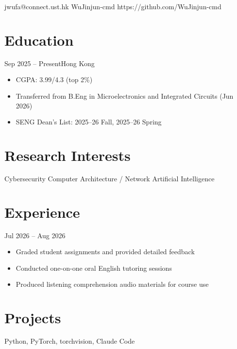 \documentclass{common/resume}
\begin{document}
  {jwufa@connect.ust.hk}
  {WuJinjun-cmd}
  {https://github.com/WuJinjun-cmd}

\section{Education}

  {Sep 2025 -- Present}{Hong Kong}

\begin{itemize}
  \item CGPA: 3.99/4.3 (top 2\%)
  \item Transferred from B.Eng in Microelectronics and Integrated Circuits (Jun 2026)
  \item SENG Dean's List: 2025--26 Fall, 2025--26 Spring
\end{itemize}

\section{Research Interests}

Cybersecurity \textbullet{} Computer Architecture / Network \textbullet{} Artificial Intelligence

\section{Experience}

  {Jul 2026 -- Aug 2026}{}

\begin{itemize}
  \item Graded student assignments and provided detailed feedback
  \item Conducted one-on-one oral English tutoring sessions
  \item Produced listening comprehension audio materials for course use
\end{itemize}

\section{Projects}

  {Python, PyTorch, torchvision, Claude Code}
\end{document}
